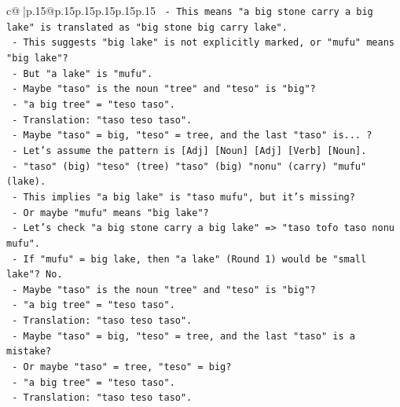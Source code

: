 \documentclass{article}
\begin{document}
{\begin{supertabular}{c@{$\;$}|p{.15\linewidth}@{}p{.15\linewidth}p{.15\linewidth}p{.15\linewidth}p{.15\linewidth}p{.15\linewidth}}
{{{\texttt{                    {-} This means "a big stone carry a big lake" is translated as "big stone big carry lake".} \\
\texttt{                    {-} This suggests "big lake" is not explicitly marked, or "mufu" means "big lake"?} \\
\texttt{                    {-} But "a lake" is "mufu".} \\
\texttt{                    {-} Maybe "taso" is the noun "tree" and "teso" is "big"?} \\
\texttt{                      {-} "a big tree" = "teso taso".} \\
\texttt{                      {-} Translation: "taso teso taso".} \\
\texttt{                      {-} Maybe "taso" = big, "teso" = tree, and the last "taso" is... ?} \\
\texttt{                      {-} Let's assume the pattern is {[}Adj{]} {[}Noun{]} {[}Adj{]} {[}Verb{]} {[}Noun{]}.} \\
\texttt{                      {-} "taso" (big) "teso" (tree) "taso" (big) "nonu" (carry) "mufu" (lake).} \\
\texttt{                      {-} This implies "a big lake" is "taso mufu", but it's missing?} \\
\texttt{                      {-} Or maybe "mufu" means "big lake"?} \\
\texttt{                      {-} Let's check "a big stone carry a big lake" => "taso tofo taso nonu mufu".} \\
\texttt{                      {-} If "mufu" = big lake, then "a lake" (Round 1) would be "small lake"? No.} \\
\texttt{                      {-} Maybe "taso" is the noun "tree" and "teso" is "big"?} \\
\texttt{                        {-} "a big tree" = "teso taso".} \\
\texttt{                        {-} Translation: "taso teso taso".} \\
\texttt{                        {-} Maybe "taso" = big, "teso" = tree, and the last "taso" is a mistake?} \\
\texttt{                        {-} Or maybe "taso" = tree, "teso" = big?} \\
\texttt{                        {-} "a big tree" = "teso taso".} \\
\texttt{                        {-} Translation: "taso teso taso".} \\
}}}
\end{supertabular}}
\end{document}
